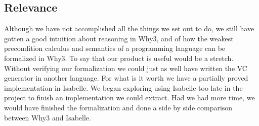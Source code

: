 \subsection{Relevance}
Although we have not accomplished all the things we set out to do, we still have gotten a good intuition about  reasoning in Why3, and of how the weakest precondition calculus and semantics of a programming language can be formalized in Why3.
To say that our product is useful would be a stretch. Without verifying our formalization we could just as well have written the VC generator in another language.
For what is it worth we have a partially proved implementation in Isabelle.
We began exploring using Isabelle too late in the project to finish an implementation we could extract.
Had we had more time, we would have finished the formalization and done a side by side comparison between Why3 and Isabelle.
